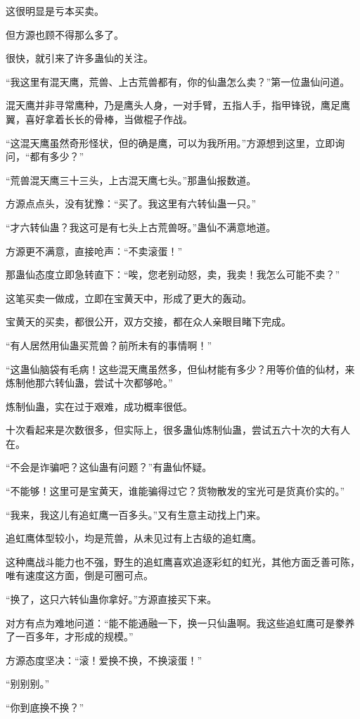 \begin{this_body}
这很明显是亏本买卖。

但方源也顾不得那么多了。

很快，就引来了许多蛊仙的关注。

“我这里有混天鹰，荒兽、上古荒兽都有，你的仙蛊怎么卖？”第一位蛊仙问道。

混天鹰并非寻常鹰种，乃是鹰头人身，一对手臂，五指人手，指甲锋锐，鹰足鹰翼，喜好拿着长长的骨棒，当做棍子作战。

“这混天鹰虽然奇形怪状，但的确是鹰，可以为我所用。”方源想到这里，立即询问，“都有多少？”

“荒兽混天鹰三十三头，上古混天鹰七头。”那蛊仙报数道。

方源点点头，没有犹豫：“买了。我这里有六转仙蛊一只。”

“才六转仙蛊？我这可是有七头上古荒兽呀。”蛊仙不满意地道。

方源更不满意，直接呛声：“不卖滚蛋！”

那蛊仙态度立即急转直下：“唉，您老别动怒，卖，我卖！我怎么可能不卖？”

这笔买卖一做成，立即在宝黄天中，形成了更大的轰动。

宝黄天的买卖，都很公开，双方交接，都在众人亲眼目睹下完成。

“有人居然用仙蛊买荒兽？前所未有的事情啊！”

“这蛊仙脑袋有毛病！这些混天鹰虽然多，但仙材能有多少？用等价值的仙材，来炼制他那六转仙蛊，尝试十次都够呛。”

炼制仙蛊，实在过于艰难，成功概率很低。

十次看起来是次数很多，但实际上，很多蛊仙炼制仙蛊，尝试五六十次的大有人在。

“不会是诈骗吧？这仙蛊有问题？”有蛊仙怀疑。

“不能够！这里可是宝黄天，谁能骗得过它？货物散发的宝光可是货真价实的。”

“我来，我这儿有追虹鹰一百多头。”又有生意主动找上门来。

追虹鹰体型较小，均是荒兽，从未见过有上古级的追虹鹰。

这种鹰战斗能力也不强，野生的追虹鹰喜欢追逐彩虹的虹光，其他方面乏善可陈，唯有速度这方面，倒是可圈可点。

“换了，这只六转仙蛊你拿好。”方源直接买下来。

对方有点为难地问道：“能不能通融一下，换一只仙蛊啊。我这些追虹鹰可是豢养了一百多年，才形成的规模。”

方源态度坚决：“滚！爱换不换，不换滚蛋！”

“别别别。”

“你到底换不换？”


\end{this_body}
